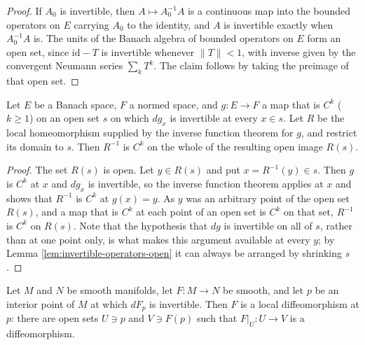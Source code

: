 \begin{proof}
\leanok
If $A_0$ is invertible, then $A \mapsto A_0^{-1} A$ is a continuous map into the bounded operators on $E$ carrying $A_0$ to the identity, and $A$ is invertible exactly when $A_0^{-1}A$ is. The units of the Banach algebra of bounded operators on $E$ form an open set, since $\mathrm{id} - T$ is invertible whenever $\|T\| < 1$, with inverse given by the convergent Neumann series $\sum_k T^k$. The claim follows by taking the preimage of that open set.
\end{proof}

\begin{lemma}
\label{lem:smooth-local-inverse-on-open}
\leanok
{}
Let $E$ be a Banach space, $F$ a normed space, and $g : E \to F$ a map that is $C^k$ ($k \geq 1$) on an open set $s$ on which $dg_x$ is invertible at every $x \in s$. Let $R$ be the local homeomorphism supplied by the inverse function theorem for $g$, and restrict its domain to $s$. Then $R^{-1}$ is $C^k$ on the whole of the resulting open image $R(s)$.
\end{lemma}

\begin{proof}
\leanok
{}
The set $R(s)$ is open. Let $y \in R(s)$ and put $x = R^{-1}(y) \in s$. Then $g$ is $C^k$ at $x$ and $dg_x$ is invertible, so the inverse function theorem applies at $x$ and shows that $R^{-1}$ is $C^k$ at $g(x) = y$. As $y$ was an arbitrary point of the open set $R(s)$, and a map that is $C^k$ at each point of an open set is $C^k$ on that set, $R^{-1}$ is $C^k$ on $R(s)$. Note that the hypothesis that $dg$ is invertible on all of $s$, rather than at one point only, is what makes this argument available at every $y$; by Lemma \ref{lem:invertible-operators-open} it can always be arranged by shrinking $s$.
\end{proof}

\begin{lemma}
\label{lem:local-diffeomorphism-from-invertible-differential}
\leanok
{}
Let $M$ and $N$ be smooth manifolds, let $F : M \to N$ be smooth, and let $p$ be an interior point of $M$ at which $dF_p$ is invertible. Then $F$ is a local diffeomorphism at $p$: there are open sets $U \ni p$ and $V \ni F(p)$ such that $F|_U : U \to V$ is a diffeomorphism.
\end{lemma}

